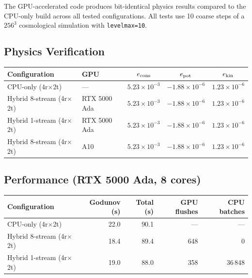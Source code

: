 \documentclass[11pt,fleqn]{book}
\begin{document}
The GPU-accelerated code produces bit-identical physics results compared to the CPU-only build across all tested configurations.  All tests use 10 coarse steps of a $256^3$ cosmological simulation with \texttt{levelmax=10}.

\subsection{Physics Verification}

\begin{center}
\begin{tabular}{llccc}
\toprule
\textbf{Configuration} & \textbf{GPU} & $e_{\rm cons}$ & $e_{\rm pot}$ & $e_{\rm kin}$ \\
\midrule
CPU-only (4r$\times$2t)            & ---               & $5.23 \times 10^{-3}$ & $-1.88 \times 10^{-6}$ & $1.23 \times 10^{-6}$ \\
Hybrid 8-stream (4r$\times$2t)     & RTX 5000 Ada      & $5.23 \times 10^{-3}$ & $-1.88 \times 10^{-6}$ & $1.23 \times 10^{-6}$ \\
Hybrid 1-stream (4r$\times$2t)     & RTX 5000 Ada      & $5.23 \times 10^{-3}$ & $-1.88 \times 10^{-6}$ & $1.23 \times 10^{-6}$ \\
Hybrid 8-stream (4r$\times$2t)     & A10               & $5.23 \times 10^{-3}$ & $-1.88 \times 10^{-6}$ & $1.23 \times 10^{-6}$ \\
\bottomrule
\end{tabular}
\end{center}

\subsection{Performance (RTX 5000 Ada, 8 cores)}

\begin{center}
\begin{tabular}{lrrrr}
\toprule
\textbf{Configuration} & \textbf{Godunov (s)} & \textbf{Total (s)} & \textbf{GPU flushes} & \textbf{CPU batches} \\
\midrule
CPU-only (4r$\times$2t)            & 22.0 & 90.1  & ---  & ---    \\
Hybrid 8-stream (4r$\times$2t)     & 18.4 & 89.4  & 648  & 0      \\
Hybrid 1-stream (4r$\times$2t)     & 19.0 & 88.0  & 358  & 36\,848 \\
\bottomrule
\end{tabular}
\end{center}
\end{document}
